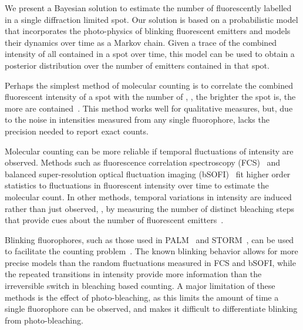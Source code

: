 %
We present a Bayesian solution to estimate the number of fluorescently labelled
\smallobjects in a single diffraction limited spot.
  Our solution is based on a probabilistic model that incorporates the
  photo-physics of blinking fluorescent emitters and models their dynamics over
  time as a Markov chain.
  Given a trace of the combined intensity of all \smallobjects contained in a
  spot over time, this model can be used to obtain a posterior distribution
  over the number of emitters contained in that spot.

%
%


%
Perhaps the simplest method of molecular counting is to correlate the combined
fluorescent intensity of a spot with the number of \smallobjects, \ie, the
brighter the spot is, the more \smallobjects are contained~\citep{schmied_2012,
tolar_2005}.
  This method works well for qualitative measures, but, due to the noise in
  intensities measured from any single fluorophore, lacks the precision needed
  to report exact counts.

%
Molecular counting can be more reliable if temporal fluctuations of intensity
are observed.
  Methods such as fluorescence correlation spectroscopy
  (FCS)~\citep{otsuka_2023,wachsmuth_2015,politi_2018} and balanced
  super-resolution optical fluctuation imaging
  (bSOFI)~\citep{geissbuehler_2012} fit higher order statistics to fluctuations
  in fluorescent intensity over time to estimate the molecular count.
  In other methods, temporal variations in intensity are induced rather than
  just observed, \eg, by measuring the number of distinct bleaching
  steps that provide cues about the number of fluorescent
  emitters~\citep{ulbrich_2007,jain_2011,hummert_2021}.

%
Blinking fluorophores, such as those used in
PALM~\citep{sengupta_pcPALM_2011,lee_counting_2012} and
STORM~\citep{patel_blinking_2021}, can be used to facilitate the counting
problem~\citep{rollins_stochastic_2015,nino_2017}.
  The known blinking behavior allows for more precise models than the random
  fluctuations measured in FCS and bSOFI, while the repeated transitions in
  intensity provide more information than the irreversible switch in bleaching
  based counting.
  A major limitation of these methods is the effect of photo-bleaching, as this
  limits the amount of time a single fluorophore can be observed, and makes it
  difficult to differentiate blinking from photo-bleaching.

